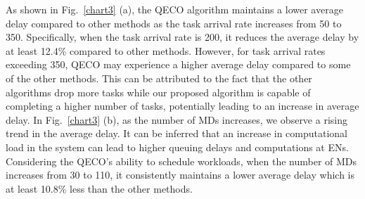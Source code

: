 \documentclass[10pt, journal,letterpaper]{IEEEtran}
\begin{document}
As shown in Fig.~\ref{chart3} (a), the QECO algorithm maintains a lower average delay compared to other methods as the task arrival rate increases from 50 to 350. Specifically, when the task arrival rate is 200, it reduces the average delay by at least 12.4\% compared to other methods. However, for task arrival rates exceeding 350, QECO may experience a higher average delay compared to some of the other methods. This can be attributed to the fact that the other algorithms drop more tasks while our proposed algorithm is capable of completing a higher number of tasks, potentially leading to an increase in average delay. In Fig.~\ref{chart3} (b), as the number of MDs increases, we observe a rising trend in the average delay. It can be inferred that an increase in computational load in the system can lead to higher queuing delays and computations at ENs. Considering the QECO's ability to schedule workloads, when the number of MDs increases from 30 to 110, it consistently maintains a lower average delay which is at least 10.8\% less than the other methods.


\end{document}
